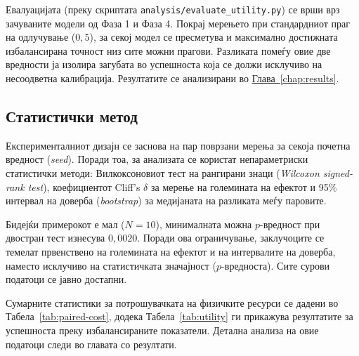 Евалуацијата (преку скриптата \texttt{analysis/evaluate\_utility.py}) се врши врз зачуваните модели од Фаза 1 и Фаза 4. Покрај мерењето при стандардниот праг на одлучување ($0{,}5$), за секој модел се пресметува и максимално достижната избалансирана точност низ сите можни прагови. Разликата помеѓу овие две вредности ја изолира загубата во успешноста која се должи исклучиво на несоодветна калибрација. Резултатите се анализирани во \hyperref[chap:results]{Глава~\ref*{chap:results}}.

\subsection{Статистички метод}

Експерименталниот дизајн се заснова на пар поврзани мерења за секоја почетна вредност (\emph{seed}). Поради тоа, за анализата се користат непараметриски статистички методи: Вилкоксоновиот тест на рангирани знаци (\emph{Wilcoxon signed-rank test}), коефициентот Cliff's $\delta$ за мерење на големината на ефектот и 95\% интервал на доверба (\emph{bootstrap}) за медијаната на разликата меѓу паровите.

Бидејќи примерокот е мал ($N=10$), минималната можна $p$-вредност при двостран тест изнесува $0{,}0020$. Поради ова ограничување, заклучоците се темелат првенствено на големината на ефектот и на интервалите на доверба, наместо исклучиво на статистичката значајност ($p$-вредноста). Сите сурови податоци се јавно достапни.

Сумарните статистики за потрошувачката на физичките ресурси се дадени во Табела~\ref{tab:paired-cost}, додека Табела~\ref{tab:utility} ги прикажува резултатите за успешноста преку избалансираните показатели. Детална анализа на овие податоци следи во главата со резултати.